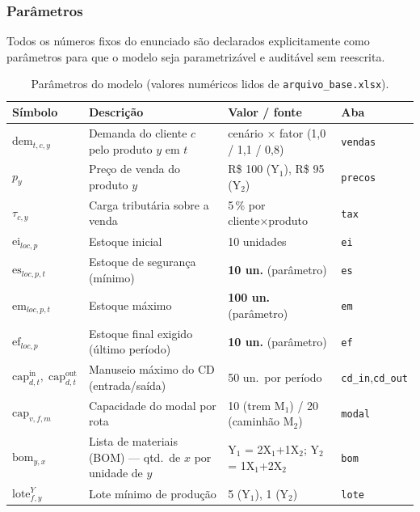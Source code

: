 \documentclass[11pt,a4paper]{article}
\begin{document}
\subsubsection*{Parâmetros}
Todos os números fixos do enunciado são declarados explicitamente como parâmetros para que o modelo seja parametrizável e auditável sem reescrita.

\begin{table}[H]
\centering
\caption{Parâmetros do modelo (valores numéricos lidos de \texttt{arquivo\_base.xlsx}).}
\label{tab:parametros}
\small
\begin{tabular}{p{2.4cm}p{6.0cm}p{4.4cm}p{1.6cm}}
\toprule
\textbf{Símbolo} & \textbf{Descrição} & \textbf{Valor / fonte} & \textbf{Aba} \\
\midrule
$\text{dem}_{t,c,y}$       & Demanda do cliente $c$ pelo produto $y$ em $t$ & cenário × fator (1,0 / 1,1 / 0,8) & \texttt{vendas} \\
$p_y$                      & Preço de venda do produto $y$                  & R\$ 100 (Y$_1$), R\$ 95 (Y$_2$) & \texttt{precos} \\
$\tau_{c,y}$               & Carga tributária sobre a venda                  & 5\,\% por cliente×produto      & \texttt{tax} \\
$\text{ei}_{loc,p}$        & Estoque inicial                                & 10 unidades                    & \texttt{ei} \\
$\text{es}_{loc,p,t}$      & Estoque de segurança (mínimo)                  & \textbf{10 un.} (parâmetro)    & \texttt{es} \\
$\text{em}_{loc,p,t}$      & Estoque máximo                                 & \textbf{100 un.} (parâmetro)   & \texttt{em} \\
$\text{ef}_{loc,p}$        & Estoque final exigido (último período)         & \textbf{10 un.} (parâmetro)    & \texttt{ef} \\
$\text{cap}^{\text{in}}_{d,t},\;\text{cap}^{\text{out}}_{d,t}$ & Manuseio máximo do CD (entrada/saída) & 50 un.\ por período          & \texttt{cd\_in},\texttt{cd\_out} \\
$\text{cap}_{v,f,m}$       & Capacidade do modal por rota                   & 10 (trem M$_1$) / 20 (caminhão M$_2$) & \texttt{modal} \\
$\text{bom}_{y,x}$         & Lista de materiais (BOM) — qtd.\ de $x$ por unidade de $y$ & Y$_1$ = 2X$_1$+1X$_2$;\; Y$_2$ = 1X$_1$+2X$_2$ & \texttt{bom} \\
$\text{lote}^Y_{f,y}$      & Lote mínimo de produção                       & 5 (Y$_1$), 1 (Y$_2$)           & \texttt{lote} \\

\end{tabular}
\end{table}
\end{document}
